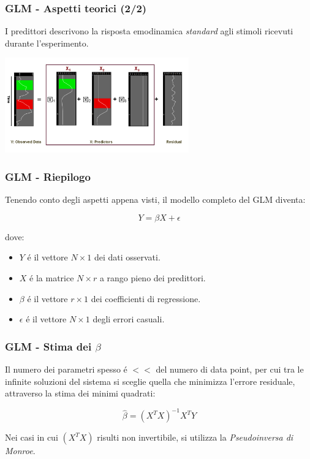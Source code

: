 \documentclass{beamer}
\begin{document}
\begin{frame}
\frametitle{GLM - Aspetti teorici (2/2)}
I \alert{predittori} descrivono la risposta emodinamica \emph{standard} agli stimoli ricevuti durante l'esperimento.

\includegraphics[keepaspectratio, width = 300px]{Images/glm_visual.png}
\end{frame}

\begin{frame}
\frametitle{GLM - Riepilogo}
Tenendo conto degli aspetti appena visti, il modello completo del GLM diventa:

$$Y = \beta X + \epsilon$$

dove:
\begin{itemize}
\item $Y$ \'e il vettore $N \times 1 $ dei dati osservati.
\item $X$ \'e la matrice $N \times r$ a rango pieno dei predittori.
\item $\beta$ \'e il vettore $r \times 1$ dei coefficienti di regressione.
\item $\epsilon$ \'e il vettore $N \times 1$ degli errori casuali.
\end{itemize}
\end{frame}

\begin{frame}
\frametitle{GLM - Stima dei $\beta$}
Il numero dei parametri spesso \'e $<<$ del numero di data point, per cui tra le infinite soluzioni del sistema si sceglie quella che minimizza l'errore residuale, attraverso la \alert{stima dei minimi quadrati}:

$$ 	\hat{\beta} = (X^TX)^{-1} X^TY$$

Nei casi in cui $(X^TX)$ risulti non invertibile, si utilizza la \emph{Pseudoinversa di Monroe}.
\end{frame}
\end{document}
